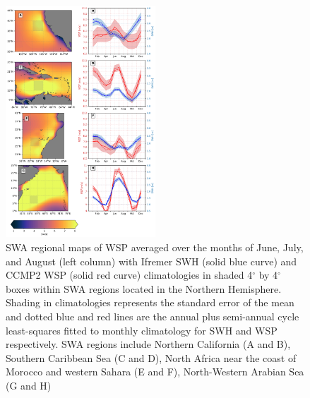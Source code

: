 \documentclass[draft,linenumbers]{agujournal2018}
\begin{document}
\begin{figure}[tbh]
\centering
\includegraphics[width=0.5\textwidth]{figs/regional_climatologies/paper_regional_clima_nh.png}
\caption{SWA regional maps of WSP averaged over the months of June, July, and August (left column) with Ifremer SWH (solid blue curve) and CCMP2 WSP (solid red curve) climatologies in shaded 4$^{\circ}$ by 4$^{\circ}$ boxes within SWA regions located in the Northern Hemisphere. Shading in climatologies represents the standard error of the mean and dotted blue and red lines are the annual plus semi-annual cycle least-squares fitted to monthly climatology for SWH and WSP respectively. SWA regions include Northern California (A and B), Southern Caribbean Sea (C and D), North Africa near the coast of Morocco and western Sahara (E and F), North-Western Arabian Sea (G and H) }
\label{reg_clima_nh}
\end{figure}
\end{document}
